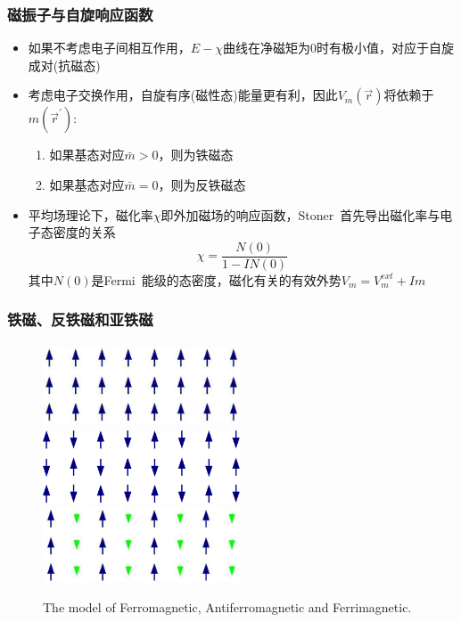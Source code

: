 \documentclass[cjk,slidestop,compress,mathserif,blue]{beamer}
\begin{document}
\frame
{
	\frametitle{磁振子与自旋响应函数}
	\begin{itemize}
		\item 如果不考虑电子间相互作用，$E-\chi$曲线在净磁矩为0时有极小值，对应于自旋成对(抗磁态)
		\item 考虑电子交换作用，自旋有序(磁性态)能量更有利，因此$V_m(\vec r)$将依赖于$m(\vec r^{\prime})$:\\
			\begin{enumerate}
				\item 如果基态对应$\bar m>0$，则为铁磁态
				\item 如果基态对应$\bar m=0$，则为反铁磁态
			\end{enumerate}
		\item 平均场理论下，磁化率$\chi$即外加磁场的响应函数，\textrm{Stoner~}首先导出磁化率与电子态密度的关系
			\begin{displaymath}
				\chi=\frac{N(0)}{1-IN(0)}
			\end{displaymath}
			其中$N(0)$是\textrm{Fermi~}能级的态密度，磁化有关的有效外势$V_m=V_m^{ext}+Im$
	\end{itemize}
}

\frame
{
	\frametitle{铁磁、反铁磁和亚铁磁}
\begin{figure}[h!]
	\vspace{-0.20in}
\centering
\includegraphics[height=0.95in,width=2.3in,viewport=0 0 350 230,clip]{Figures/Ferromagnetic.jpeg}\\
\includegraphics[height=0.85in,width=2.3in,viewport=0 -13 350 155,clip]{Figures/Antiferromagnetic.png}\\
\includegraphics[height=0.88in,width=2.3in,viewport=0 0 350 225,clip]{Figures/Ferrimagnetic.jpeg}
\caption{\tiny \textrm{The model of Ferromagnetic, Antiferromagnetic and Ferrimagnetic.}}%
\label{Ferrimagneitic_Model}
\end{figure} 
}
\end{document}
